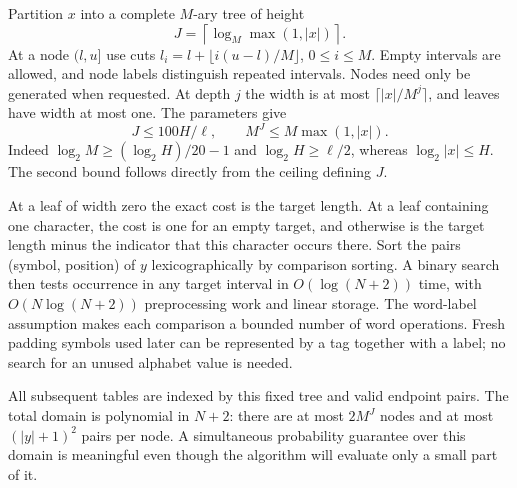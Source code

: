 Partition $x$ into a complete $M$-ary tree of height
\[
 J=\left\lceil\log_M\max(1,|x|)\right\rceil.
\]
At a node $(l,u]$ use cuts
$l_i=l+\lfloor i(u-l)/M\rfloor$, $0\le i\le M$.
Empty intervals are allowed, and node labels distinguish repeated
intervals. Nodes need only be generated when requested. At depth $j$ the
width is at most $\lceil|x|/M^j\rceil$, and leaves have width at most one.
The parameters give
\begin{equation}\label{eq:tree-bounds}
 J\le100H/\ell,\qquad M^J\le M\max(1,|x|).
\end{equation}
Indeed $\log_2M\ge (\log_2H)/20-1$ and
$\log_2H\ge\ell/2$, whereas $\log_2|x|\le H$.
The second bound follows directly from the ceiling defining $J$.

At a leaf of width zero the exact cost is the target length. At a leaf
containing one character, the cost is one for an empty target, and otherwise
is the target length minus the indicator that this character occurs there.
Sort the pairs (symbol, position) of $y$ lexicographically by comparison
sorting. A binary search then tests occurrence in any target interval in
$O(\log(N+2))$ time, with $O(N\log(N+2))$ preprocessing work and linear
storage. The word-label assumption makes each comparison a bounded number
of word operations. Fresh padding symbols used later can be represented by
a tag together with a label; no search for an unused alphabet value is
needed.

All subsequent tables are indexed by this fixed tree and valid endpoint
pairs. The total domain is polynomial in $N+2$: there are at most
$2M^J$ nodes and at most $(|y|+1)^2$ pairs per node. A simultaneous
probability guarantee over this domain is meaningful even though the
algorithm will evaluate only a small part of it.
